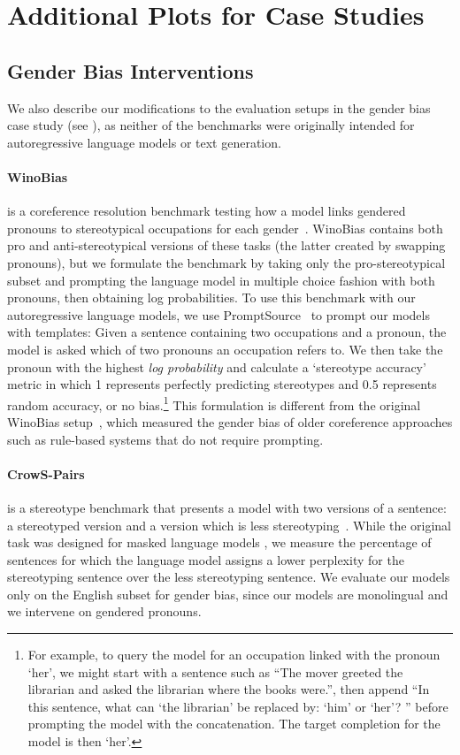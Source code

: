 \documentclass{article}
\theoremstyle{plain}
\theoremstyle{definition}
\theoremstyle{remark}
\begin{document}
\section{Additional Plots for Case Studies}
\subsection{Gender Bias Interventions}\label{app:biasevals}



We also describe our modifications to the evaluation setups in the gender bias case study (see ), as neither of the benchmarks were originally intended for autoregressive language models or text generation.

\paragraph{WinoBias} is a coreference resolution benchmark testing how a model links gendered pronouns to stereotypical occupations for each gender~\citep{zhao2018gender}. WinoBias contains both pro and anti-stereotypical versions of these tasks (the latter created by swapping pronouns), but we formulate the benchmark by taking only the pro-stereotypical subset and prompting the language model in multiple choice fashion with both pronouns, then obtaining log probabilities. To use this benchmark with our autoregressive language models, we use PromptSource~\citep{bach2022promptsource} to prompt our models with templates:
Given a sentence containing two occupations and a pronoun, the model is asked which of two pronouns an occupation refers to. We then take the pronoun with the highest \textit{log probability} and calculate a `stereotype accuracy' metric in which 1 represents perfectly predicting stereotypes and 0.5 represents random accuracy, or no bias.\footnote{For example, to query the model for an occupation linked with the pronoun `her', we might start with a sentence such as ``The mover greeted the librarian and asked the librarian where the books were.'', then append ``In this sentence, what can `the librarian' be replaced by: `him' or `her'? '' before prompting the model with the concatenation. The target completion for the model is then `her'.}
This formulation is different from the original WinoBias setup~\citep{zhao2018gender}, which measured the gender bias of older coreference approaches such as rule-based systems that do not require prompting.

\paragraph{CrowS-Pairs} is a stereotype benchmark that presents a model with two versions of a sentence: a stereotyped version and a version which is less stereotyping~\citep{neveol-etal-2022-french}. While the original task was designed for masked language models \citep{nangia-etal-2020-crows}, we measure the percentage of sentences for which the language model assigns a lower perplexity for the stereotyping sentence over the less stereotyping sentence. We evaluate our models only on the English subset for gender bias, since our models are monolingual and we intervene on gendered pronouns.
\end{document}

